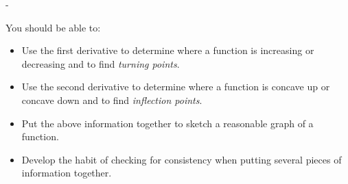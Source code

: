 \documentclass{article}
\makeatletter
\newlength{\tipmargin}
\renewenvironment{framed}{
  \setlength{\tipmargin}{\textwidth-\linewidth}
  \advance\@totalleftmargin-\tipmargin
  \def\FrameCommand{\hspace{\tipmargin}\fbox}%
  \advance\linewidth\tipmargin
  \MakeFramed {\advance\hsize-\width \FrameRestore}%
}
{\endMakeFramed}
\makeatother
\begin{document}

\begin{problemonly}
  \begin{framed}

You should be able to:
    \begin{itemize}[topsep=0pt,partopsep=0pt,parsep=8pt,itemsep=0pt]

    \item Use the first derivative to determine where a function is
      increasing or decreasing and to find \emph{turning points}.

    \item Use the second derivative to determine where a function is
      concave up or concave down and to find \emph{inflection points}. 

    \item Put the above information together to sketch a reasonable graph
      of a function.

    \item Develop the habit of checking for consistency when putting several pieces of information together. 
    \end{itemize}
  \end{framed}
\end{problemonly}
\end{document}
